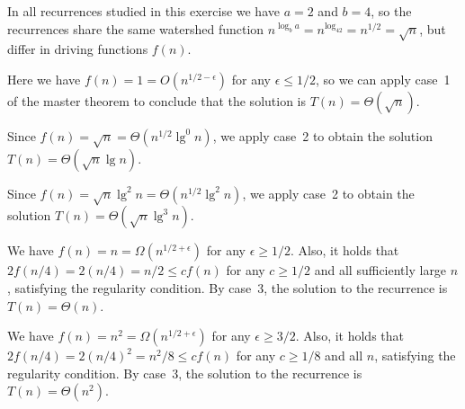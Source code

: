 In all recurrences studied in this exercise we have $a=2$ and $b=4$, so the recurrences share the same watershed function $n^{\log_ba}=n^{\log_42}=n^{1/2}=\sqrt{n}$, but differ in driving functions $f(n)$.
\vspace*{2\baselineskip}

\subexercise
Here we have $f(n)=1=O(n^{1/2-\epsilon})$ for any $\epsilon\le1/2$, so we can apply case~1 of the master theorem to conclude that the solution is $T(n)=\Theta(\sqrt{n})$.

\subexercise
Since $f(n)=\sqrt{n}=\Theta(n^{1/2}\lg^0n)$, we apply case~2 to obtain the solution $T(n)=\Theta(\sqrt{n}\lg n)$.

\subexercise
Since $f(n)=\sqrt{n}\lg^2n=\Theta(n^{1/2}\lg^2n)$, we apply case~2 to obtain the solution $T(n)=\Theta(\sqrt{n}\lg^3n)$.

\subexercise
We have $f(n)=n=\Omega(n^{1/2+\epsilon})$ for any $\epsilon\ge1/2$.
Also, it holds that $2f(n/4)=2(n/4)=n/2\le cf(n)$ for any $c\ge1/2$ and all sufficiently large $n$, satisfying the regularity condition.
By case~3, the solution to the recurrence is $T(n)=\Theta(n)$.

\subexercise
We have $f(n)=n^2=\Omega(n^{1/2+\epsilon})$ for any $\epsilon\ge3/2$.
Also, it holds that $2f(n/4)=2(n/4)^2=n^2\!/8\le cf(n)$ for any $c\ge1/8$ and all $n$, satisfying the regularity condition.
By case~3, the solution to the recurrence is $T(n)=\Theta(n^2)$.
